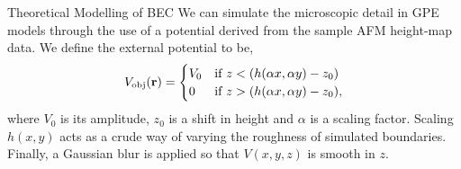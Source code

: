 \begin{chapter}{\label{cha:theoretical_model}Theoretical Modelling of BEC}
We can simulate the microscopic detail in GPE models through the use of a potential derived from the sample AFM height-map data. We define the external potential to be,
\begin{equation}
V_{\mathrm{obj}}({\bf r}) =
\begin{cases}
V_0 &\mbox{if } z < (h(\alpha x,\alpha y)-z_0)  \\
0 &\mbox{if } z > (h(\alpha x,\alpha y)-z_0),
\end{cases}
\label{eq:potentialAFM3D}
\end{equation}
where $V_0$ is its amplitude, $z_0$ is a shift in height and $\alpha$ is a scaling factor. Scaling $h(x,y)$ acts as a crude way of varying 
the roughness of simulated boundaries. Finally, a Gaussian blur is applied so that $V(x,y,z)$ is smooth in $z$.

\end{chapter}

